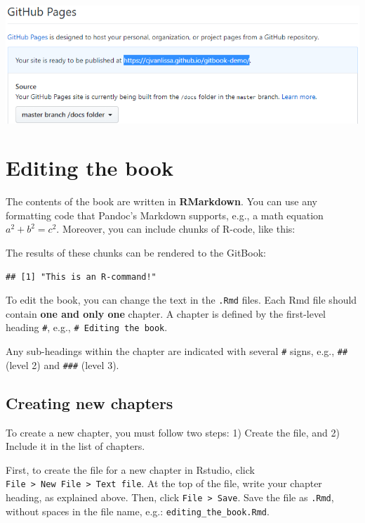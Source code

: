 \documentclass[
]{book}
\begin{document}
\begin{enumerate}
  \includegraphics{./img/pages_published.png}
\end{enumerate}

\hypertarget{editing-the-book}{%
\chapter{Editing the book}\label{editing-the-book}}

The contents of the book are written in \textbf{RMarkdown}. You can use any formatting code that Pandoc's Markdown supports, e.g., a math equation \(a^2 + b^2 = c^2\). Moreover, you can include chunks of R-code, like this:

The results of these chunks can be rendered to the GitBook:

\begin{verbatim}
## [1] "This is an R-command!"
\end{verbatim}

To edit the book, you can change the text in the \texttt{.Rmd} files. Each Rmd file should contain \textbf{one and only one} chapter. A chapter is defined by the first-level heading \texttt{\#}, e.g., \texttt{\#\ Editing\ the\ book}.

Any sub-headings within the chapter are indicated with several \texttt{\#} signs, e.g., \texttt{\#\#} (level 2) and \texttt{\#\#\#} (level 3).

\hypertarget{creating-new-chapters}{%
\section{Creating new chapters}\label{creating-new-chapters}}

To create a new chapter, you must follow two steps: 1) Create the file, and 2) Include it in the list of chapters.

First, to create the file for a new chapter in Rstudio, click \texttt{File\ \textgreater{}\ New\ File\ \textgreater{}\ Text\ file}. At the top of the file, write your chapter heading, as explained above. Then, click \texttt{File\ \textgreater{}\ Save}. Save the file as \texttt{.Rmd}, without spaces in the file name, e.g.: \texttt{editing\_the\_book.Rmd}.
\end{document}
